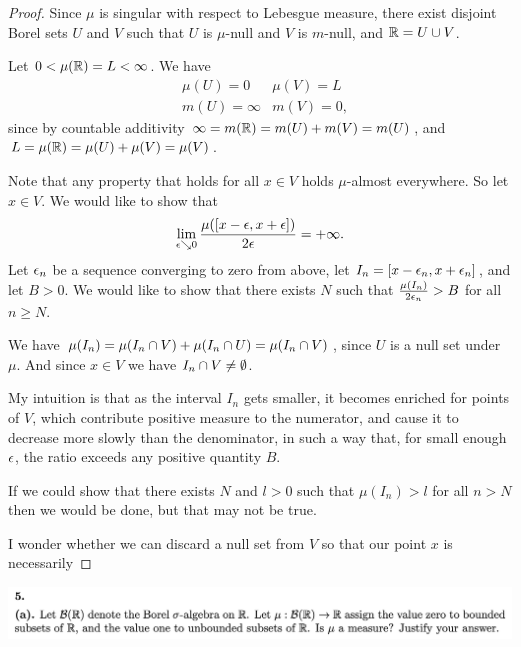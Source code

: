 \begin{proof}
  Since $\mu$ is singular with respect to Lebesgue measure, there exist disjoint Borel sets $U$ and $V$ such
  that $U$ is $\mu$-null and $V$ is $m$-null, and $\mathbb{R} = U \cup V$.

  Let $0 < \mu(\mathbb{R}) = L < \infty$. We have
  \begin{align*}
    &\mu(U) = 0     & \mu(V) = L \\
    &m(U) = \infty & m(V) = 0,
  \end{align*}
  since by countable additivity $\infty = m(\mathbb{R}) = m(U) + m(V) = m(U)$,
  and $L = \mu(\mathbb{R}) = \mu(U) + \mu(V) = \mu(V)$.

  Note that any property that holds for all $x \in V$ holds $\mu$-almost everywhere. So let $x \in V$. We would
  like to show that
  \begin{align*}
    \lim_{\eps \searrow 0} \frac{\mu([x - \eps, x + \eps])}{2\eps} = +\infty.
  \end{align*}
  Let $\epsilon_n$ be a sequence converging to zero from above, let $I_n = [x - \epsilon_n, x + \epsilon_n]$, and
  let $B > 0$. We would like to show that there exists $N$ such that $\frac{\mu(I_n)}{2\epsilon_n} > B$ for
  all $n \geq N$.

  We have $\mu(I_n) = \mu(I_n \cap V) + \mu(I_n \cap U) = \mu(I_n \cap V)$, since $U$ is a null set
  under $\mu$. And since $x \in V$ we have $I_n \cap V \neq \emptyset$.

  My intuition is that as the interval $I_n$ gets smaller, it becomes enriched for points of $V$, which
  contribute positive measure to the numerator, and cause it to decrease more slowly than the denominator, in
  such a way that, for small enough $\epsilon$, the ratio exceeds any positive quantity $B$.

  If we could show that there exists $N$ and $l > 0$ such that $\mu(I_n) > l$ for all $n > N$ then we
  would be done, but that may not be true.

  I wonder whether we can discard a null set from $V$ so that our point $x$ is necessarily
\end{proof}


\newpage
\begin{mdframed}
\includegraphics[width=400pt]{img/analysis--berkeley-202a-final-246a.png}
\end{mdframed}


